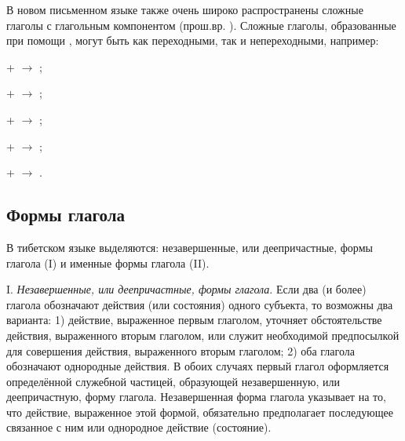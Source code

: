 В новом письменном языке также очень широко распространены сложные глаголы с глагольным компонентом  (прош.вр. ). Сложные глаголы, образованные при помощи , могут быть как переходными, так и непереходными, например:
\begin{prfsample}
	\item {} +  $\rightarrow$ ;
	\item {} +  $\rightarrow$ ;
	\item {} +  $\rightarrow$ ;
	\item {} +  $\rightarrow$ ;
	\item {} +  $\rightarrow$ .
\end{prfsample}

\subsection{Формы глагола}

В тибетском языке выделяются: незавершенные, или деепричастные, формы глагола (I) и именные формы глагола (II).

I. \emph{Незавершенные, или деепричастные, формы глагола}. Если два (и более) глагола обозначают действия (или состояния) одного субъекта, то возможны два варианта: 1) действие, выраженное первым глаголом, уточняет обстоятельстве действия, выраженного вторым глаголом, или служит необходимой предпосылкой для совершения действия, выраженного вторым глаголом; 2) оба глагола обозначают однородные действия. В обоих случаях первый глагол оформляется определённой служебной частицей, образующей незавершенную, или деепричастную, форму глагола. Незавершенная форма глагола указывает на то, что действие, выраженное этой формой, обязательно предполагает последующее связанное с ним или однородное действие (состояние).

